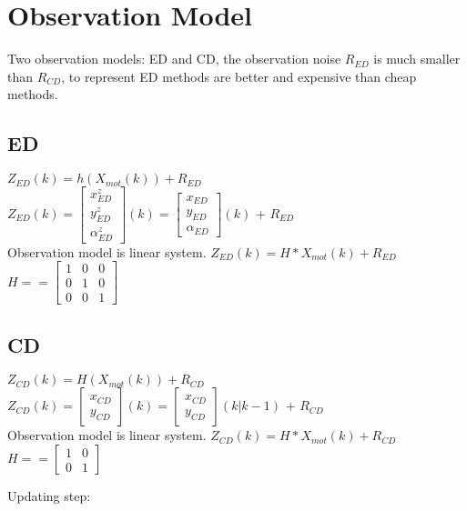 \documentclass[11pt,a4paper]{article}
\begin{document}
   
\section{Observation Model}
Two observation models: ED and CD, the observation noise $R_{ED}$ is much smaller than $R_{CD}$, to represent ED methods are better and expensive than cheap methods.
\subsection{ED}
$Z_{ED}(k) = h(X_{mot}(k)) + R_{ED}$
\\
$Z_{ED}(k) = \begin{bmatrix} x_{ED}^{z} \\ y_{ED}^{z} \\ \alpha_{ED}^{z} \end{bmatrix}(k) = \begin{bmatrix} x_{ED} \\ y_{ED} \\ \alpha_{ED} \end{bmatrix}(k)$ + $R_{ED}$ 
\\
Observation model is linear system. $Z_{ED}(k) = H*X_{mot}(k) + R_{ED}$
\\
$H == \begin{bmatrix} 1 & 0 & 0 \\ 0 & 1 & 0 \\ 0 & 0 & 1 \end{bmatrix}$




\subsection{CD}
$Z_{CD}(k) = H(X_{mot}(k)) + R_{CD}$
\\
$Z_{CD}(k) = \begin{bmatrix} x_{CD} \\ y_{CD} \end{bmatrix}(k) = \begin{bmatrix} x_{CD} \\ y_{CD} \end{bmatrix}(k|k-1)$ + $R_{CD}$ 
\\
Observation model is linear system. $Z_{CD}(k) = H*X_{mot}(k) + R_{CD}$
\\
$H == \begin{bmatrix} 1 & 0 \\ 0 & 1 \end{bmatrix}$


\noindent Updating step:
\end{document}
